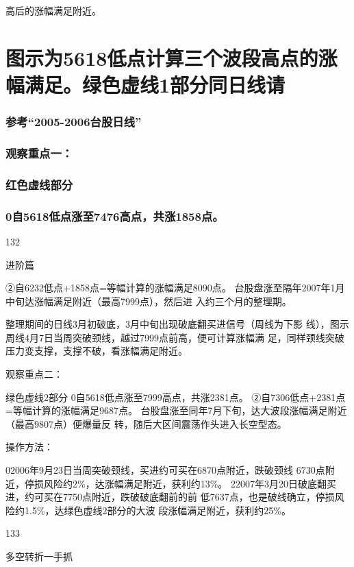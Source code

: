 \documentclass{article}
\begin{document}
高后的涨幅满足附近。

\section{图示为5618低点计算三个波段高点的涨幅满足。绿色虚线1部分同日线请}

\subsubsection{参考“2005-2006台股日线”}

\subsubsection{观察重点一：}

\subsubsection{红色虚线部分}

\subsubsection{0自5618低点涨至7476高点，共涨1858点。}

132

\clearpage

进阶篇

②自6232低点+1858点=等幅计算的涨幅满足8090点。 台股盘涨至隔年2007年1月中旬达涨幅满足附近（最高7999点），然后进 入约三个月的整理期。

整理期间的日线3月初破底，3月中旬出现破底翻买进信号（周线为下影 线），图示周线4月7日当周突破颈线，越过7999点前高，便可计算涨幅满 足，同样颈线突破压力变支撑，支撑不破，看涨幅满足附近。

观察重点二：

绿色虚线2部分 0自5618低点涨至7999高点，共涨2381点。 ②自7306低点+2381点=等幅计算的涨幅满足9687点。 台股盘涨至同年7月下旬，达大波段涨幅满足附近（最高9807点）便爆量反 转，随后大区间震荡作头进入长空型态。

操作方法：

02006年9月23日当周突破颈线，买进约可买在6870点附近，跌破颈线 6730点附近，停损风险约2\%，达涨幅满足附近，获利约13\%。 22007年3月20日破底翻买进，约可买在7750点附近，跌破破底翻前的前 低7637点，也是破线确立，停损风险约1.5\%，达绿色虚线2部分的大波 段涨幅满足附近，获利约25\%。

133

\clearpage

多空转折一手抓
\end{document}
